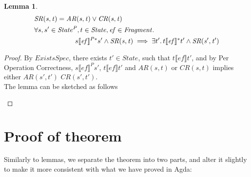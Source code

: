 \documentclass[a4paper,11pt]{article}
\newtheorem{lemma}[theorem]{Lemma}
\theoremstyle{definition}
\begin{document}
\begin{lemma}\label{lemma-1}
	\begin{align*}
		&\mathit{SR(s, t)} = \mathit{AR(s, t)} \lor \mathit{CR(s, t)}\\
		&\forall s, s' \in \mathit{State^P}, t \in \mathit{State}, \mathit{ef} \in \mathit{Fragment} \ldotp\\
		&\qquad \qquad \qquad s \llbracket \mathit{ef} \rrbracket^{P*} s'  \land \mathit{SR(s, t)} \implies \exists t' \ldotp t\llbracket \mathit{ef} \rrbracket^* t' \land \mathit{SR(s', t')} \\
	\end{align*}
\end{lemma}
\begin{proof}
	By $\mathit{ExistsSpec}$, there exists $t' \in State$, such that $t \llbracket \mathit{ef} \rrbracket t'$, and by Per Operation Correctness, $s \llbracket \mathit{ef} \rrbracket^P s'$, $t \llbracket \mathit{ef} \rrbracket t'$ and $\mathit{AR(s, t)}$ or $\mathit{CR(s, t)}$ implies either $\mathit{AR(s', t')}$ $\mathit{CR(s', t')}$. \\
	The lemma can be sketched as follows
	\begin{figure} [h] \centering
{}
	\end{figure}
\end{proof}

\section{Proof of theorem}

Similarly to lemmas, we separate the theorem into two parts, and alter it slightly to make it more consistent with what we have proved in Agda:
\end{document}

